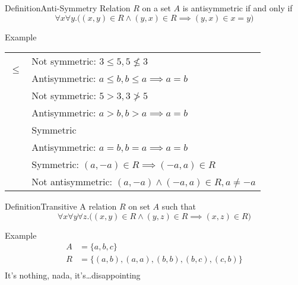 \documentclass{MathNotes}
\newenvironment{example}[1]{\begin{BlueBox}{Example}{#1}}{\end{BlueBox}}
\newenvironment{definition}[1]{\begin{RedBox}{Definition}{#1}}{\end{RedBox}}
\begin{document}
\begin{definition}{Anti-Symmetry}
	Relation $R$ on a set $A$ is antisymmetric if and only if
	\[\forall x\forall y.\big((x,y)\in R\land(y,x)\in R\implies(y,x)\in x=y)\]
\end{definition}
\begin{example}{}
	\centering
	\begin{tabular}{cl}
		\multirow{2}{*}{$\leq$}                                 & Not symmetric: $3\leq5,5\not\leq3$                   \\
		                                                        & Antisymmetric: $a\leq b,b\leq a\implies a=b$         \\
		\hdashline
		\multirow{2}{*}{$>$}                                    & Not symmetric: $5>3,3\not>5$                         \\
		                                                        & Antisymmetric: $a>b,b>a\implies a=b$                 \\
		\hdashline
		\multirow{2}{*}{$=$}                                    & Symmetric                                            \\
		                                                        & Antisymmetric: $a=b,b=a\implies a=b$                 \\
		\hdashline
		\multirow{2}{*}{$\{(a,b)|a,b\in\mathbb{Z}\land a=-b\}$} & Symmetric: $(a,-a)\in R\implies (-a,a)\in R$         \\
		                                                        & Not antisymmetric: $(a,-a)\land(-a,a)\in R,a\neq -a$ \\
	\end{tabular}
\end{example}

\begin{definition}{Transitive}
	A relation $R$ on set $A$ such that
	\[\forall x\forall y\forall z.\big((x,y)\in R\land(y,z)\in R\implies(x,z)\in R\big)\]
\end{definition}

\begin{example}{}
	\begin{align*}
		A & = \{a,b,c\}                         \\
		R & = \{(a,b),(a,a),(b,b),(b,c),(c,b)\} \\
	\end{align*}
	It's nothing, nada, it's\ldots disappointing
\end{example}
\end{document}
